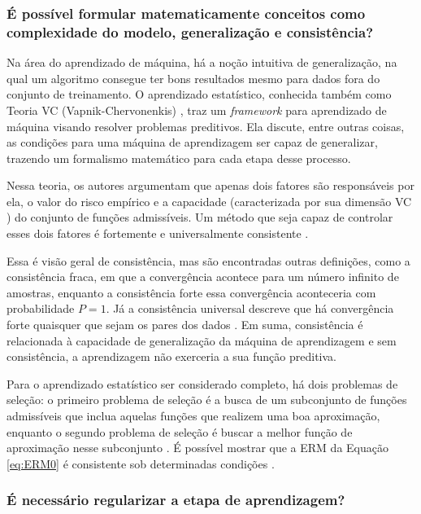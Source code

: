 \subsubsection{É possível formular matematicamente conceitos como complexidade do modelo, generalização e consistência?}\label{sec:vapnik}

Na área do aprendizado de máquina, há a noção intuitiva de generalização, na qual um algoritmo consegue ter bons resultados mesmo para dados fora do conjunto de treinamento. O aprendizado estatístico, conhecida também como Teoria VC (Vapnik-Chervonenkis) \cite{Vapnik2019}, traz um \textit{framework} para aprendizado de máquina visando resolver problemas preditivos. Ela discute, entre outras coisas, as condições para uma máquina de aprendizagem ser capaz de generalizar, trazendo um formalismo matemático para cada etapa desse processo. 

Nessa teoria, os autores argumentam que apenas dois fatores são responsáveis por ela, o valor do risco empírico e a capacidade (caracterizada por sua dimensão VC \cite[pág. 147]{vapnik1998statistical}) do conjunto de funções admissíveis. Um método que seja capaz de controlar esses dois fatores é fortemente e universalmente consistente \cite[pág. 429]{Vapnik2006}. 

Essa é visão geral de consistência, mas são encontradas outras definições, como a consistência fraca, em que a convergência acontece para um número infinito de amostras, enquanto a consistência forte essa convergência aconteceria com probabilidade $P = 1$. Já a consistência universal descreve que há convergência forte quaisquer que sejam os pares dos dados \cite[pág. 91-2]{devroye1996a}. Em suma, consistência é relacionada à capacidade de generalização da máquina de aprendizagem e sem consistência, a aprendizagem não exerceria a sua função preditiva.

Para o aprendizado estatístico ser considerado completo, há dois problemas de seleção: o primeiro problema de seleção é a busca de um subconjunto de funções admissíveis que inclua aquelas funções que realizem uma boa aproximação, enquanto o segundo problema de seleção é buscar a melhor função de aproximação nesse subconjunto \cite{Vapnik2019}. É possível mostrar que a ERM da Equação \eqref{eq:ERM0} é consistente sob determinadas condições \cite[págs. 101-4] {cherkassky2007learning}.


\subsubsection{É necessário regularizar a etapa de aprendizagem?}\label{sec:general2}

